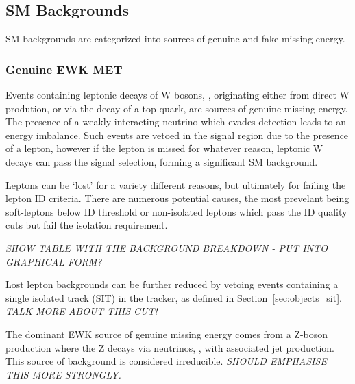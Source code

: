 \subsection{SM Backgrounds}
SM backgrounds are categorized into sources of genuine and fake 
missing energy.

\subsubsection{Genuine EWK MET}
Events containing leptonic decays of W bosons, \wlnu, originating either
from direct W prodution, or via the decay of a top quark, are sources of genuine 
missing energy. The presence of a weakly interacting neutrino which evades
detection leads to an energy imbalance. Such events are vetoed in the signal
region due to the presence of a 
lepton, however if the lepton is missed for whatever reason, leptonic W decays 
can pass the signal selection, forming a significant SM background.


Leptons can be `lost' for a variety different reasons, but ultimately for failing
the lepton ID criteria. There are numerous potential causes, the 
most prevelant being soft-leptons below ID threshold or non-isolated leptons 
which pass the ID quality cuts but fail the isolation requirement.

\emph{SHOW TABLE WITH THE BACKGROUND BREAKDOWN - PUT INTO GRAPHICAL FORM?}

Lost lepton backgrounds can be further reduced by vetoing events containing a single 
isolated track (SIT) in the tracker, as defined in Section~\ref{sec:objects_sit}. 
\emph{TALK MORE ABOUT THIS CUT!}

The dominant EWK source of genuine missing energy comes from a Z-boson 
production where the Z decays
via neutrinos, \zinv, with associated jet production. This source of background
is considered irreducible. \emph{SHOULD EMPHASISE THIS MORE STRONGLY.}

